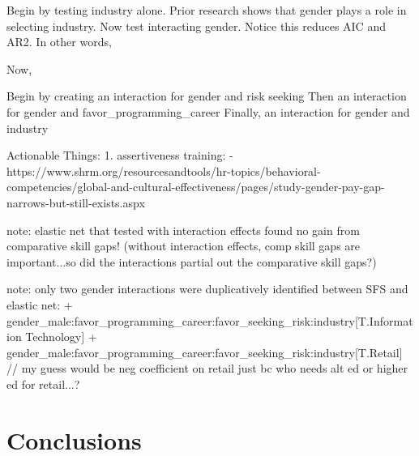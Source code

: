 \documentclass[review]{elsarticle}
\begin{document}

Begin by testing industry alone. Prior research shows that gender plays a role in selecting industry.
Now test interacting gender. Notice this reduces AIC and AR2. In other words,

Now,

Begin by creating an interaction for gender and risk seeking
Then an interaction for gender and favor_programming_career
Finally, an interaction for gender and industry


Actionable Things:
1.  assertiveness training:
 - https://www.shrm.org/resourcesandtools/hr-topics/behavioral-competencies/global-and-cultural-effectiveness/pages/study-gender-pay-gap-narrows-but-still-exists.aspx

note: elastic net that tested with interaction effects found no gain from comparative skill gaps!
(without interaction effects, comp skill gaps are important...so did the interactions partial out the comparative skill gaps?)


note: only two gender interactions were duplicatively identified between SFS and elastic net:
+ gender_male:favor_programming_career:favor_seeking_risk:industry[T.Information Technology]
+ gender_male:favor_programming_career:favor_seeking_risk:industry[T.Retail]
// my guess would be neg coefficient on retail just bc who needs alt ed or higher ed for retail...?

\section{Conclusions}


\end{document}
